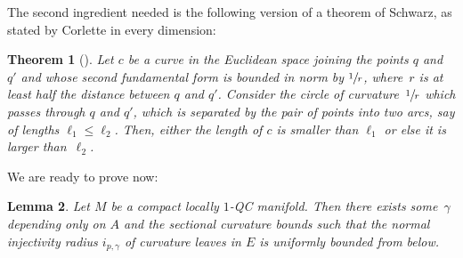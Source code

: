 \documentclass[JEP,XML,SOM,Unicode]{cedram}
\newtheorem{theorem}{Theorem}[section]
\newtheorem{lemma}[theorem]{Lemma}
\theoremstyle{definition}
\theoremstyle{remark}
\numberwithin{equation}{section}
\begin{document}
The second ingredient needed is the following version of a theorem of Schwarz, as stated by Corlette in every dimension:

\begin{theorem}[{\cite[Th.\,2.3]{Cor}}]\label{Schwarz}
Let $c$ be a curve in the Euclidean space joining the points $q$ and $q'$ and whose second fundamental form is
bounded in norm by $\sfrac{1}{r}$, where~$r$ is at least half the distance between $q$ and $q'$.
Consider the circle of curvature~$\sfrac{1}{r}$ which passes through $q$ and $q'$, which is separated
by the pair of points into two arcs, say of lengths $\ell_1 \leq \ell_2$.
Then, either the length of $c$ is smaller than $\ell_1$ or else it is larger than~$\ell_2$.
\end{theorem}

We are ready to prove now:
\begin{lemma}\label{localnormal}
Let $M$ be a compact locally $1$-QC manifold. Then there exists some~$\gamma$ depending only on $A$ and the sectional curvature bounds
such that the normal injectivity radius $i_{p,\gamma}$ of curvature leaves in $E$ is
uniformly bounded from below.
\end{lemma}
\end{document}
